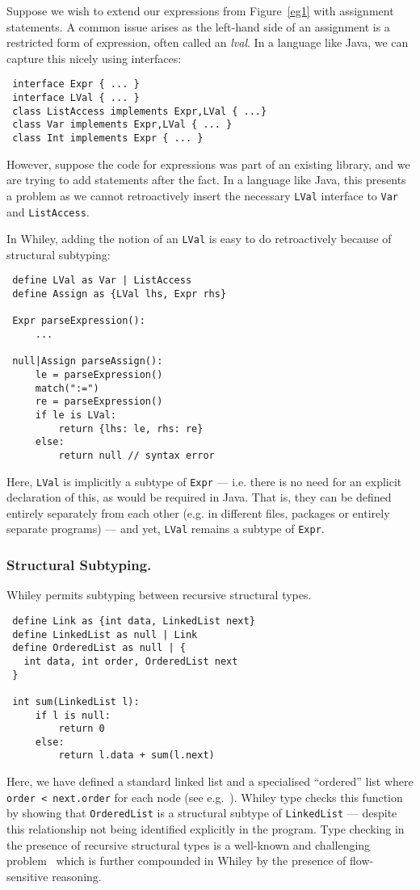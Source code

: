 Suppose we wish to extend our expressions from Figure~\ref{eg1} with
assignment statements.  A common issue arises as the left-hand side of
an assignment is a restricted form of expression, often called an {\em
  lval}.  In a language like Java, we can capture this nicely using
interfaces:
\begin{lstlisting}
 interface Expr { ... }
 interface LVal { ... }
 class ListAccess implements Expr,LVal { ...}
 class Var implements Expr,LVal { ... }
 class Int implements Expr { ... }
\end{lstlisting}
However, suppose the code for expressions was part of an existing
library, and we are trying to add statements after the fact.  In a
language like Java, this presents a problem as we cannot
retroactively insert the necessary \lstinline{LVal} interface to
\lstinline{Var} and \lstinline{ListAccess}.

In Whiley, adding the notion of an \lstinline{LVal} is easy to do
retroactively because of structural subtyping:

\begin{lstlisting}
 define LVal as Var | ListAccess 
 define Assign as {LVal lhs, Expr rhs}
 
 Expr parseExpression():
     ...

 null|Assign parseAssign():
     le = parseExpression()
     match(":=")
     re = parseExpression()
     if le is LVal:
         return {lhs: le, rhs: re}
     else:
         return null // syntax error
\end{lstlisting}
Here, \lstinline{LVal} is implicitly a subtype of \lstinline{Expr} ---
i.e. there is no need for an explicit declaration of this, as would be
required in Java.  That is, they can be defined entirely separately
from each other (e.g. in different files, packages or entirely
separate programs) --- and yet, \lstinline{LVal} remains a subtype of
\lstinline{Expr}.

\subsubsection{Structural Subtyping.}
Whiley permits subtyping between recursive structural types.
\begin{lstlisting}
 define Link as {int data, LinkedList next}
 define LinkedList as null | Link
 define OrderedList as null | {
   int data, int order, OrderedList next
 }

 int sum(LinkedList l):
     if l is null:
         return 0
     else:
         return l.data + sum(l.next)
\end{lstlisting}
Here, we have defined a standard linked list and a specialised
``ordered'' list where \lstinline{order < next.order} for each node
(see e.g.~\cite{DS87}).  Whiley type checks this function by showing
that \lstinline{OrderedList} is a structural subtype of
\lstinline{LinkedList} --- despite this relationship not being
identified explicitly in the program.  Type checking in the presence
of recursive structural types is a well-known and challenging
problem~\cite{GLP02,CA93,KPS93} which is further compounded in Whiley
by the presence of flow-sensitive reasoning.

